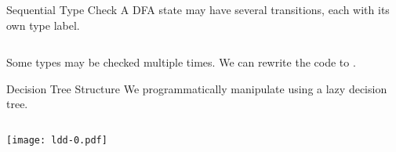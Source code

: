 \newsavebox\typecaseJhbox
\begin{lrbox}{\typecaseJhbox}
  \begin{minipage}{8cm}
    
  \end{minipage}
\end{lrbox}

\newsavebox\typecaseKbox
\begin{lrbox}{\typecaseKbox}
  \begin{minipage}{8cm}
    
  \end{minipage}
\end{lrbox}


\newsavebox\typecaseKhbox
\begin{lrbox}{\typecaseKhbox}
  \begin{minipage}{8cm}
    
  \end{minipage}
\end{lrbox}



\begin{frame}{Sequential Type Check}
  A DFA state may have several  transitions, each with its own type label.
  \begin{columns}
    \begin{column}{0.5\textwidth}
      \scalebox{0.9}{}
    \end{column}
    \begin{column}{0.5\textwidth}  %
      \usebox\typecaseAbox
    \end{column}    
  \end{columns}

  Some types may be checked multiple times.  We can rewrite the code to .
\end{frame}

\begin{frame}{Decision Tree Structure}
  We programmatically manipulate  using a lazy decision tree.

  \begin{columns}
    \begin{column}{0.5\textwidth}
      \texttt{[image: ldd-0.pdf]}
    \end{column}
    \begin{column}{0.5\textwidth}  %
      \usebox\typecaseAbox
    \end{column}    
  \end{columns}
\end{frame}

